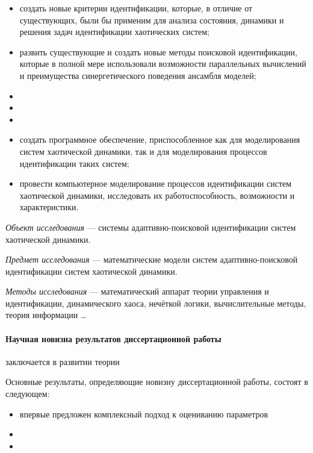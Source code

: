 \begin{itemize}

\item
  создать новые критерии идентификации, которые, в отличие от существующих,
  были бы применим для анализа состояния, динамики и решения задач идентификации
  хаотических систем;

\item
  развить существующие и создать новые методы поисковой идентификации,
  которые в полной мере использовали возможности
  параллельных вычислений и преимущества синергетического поведения
  ансамбля моделей;

\item


\item

\item

\item
  создать программное обеспечение, приспособленное как
  для моделирования систем хаотической динамики,
  так и для моделирования процессов идентификации таких систем;

\item
  провести компьютерное моделирование процессов идентификации систем хаотической динамики,
  исследовать их работоспособность, возможности и характеристики.


\end{itemize}

\textit{Объект исследования} ---
системы адаптивно-поисковой идентификации систем хаотической динамики.

\textit{Предмет исследования} ---
математические модели систем адаптивно-поисковой идентификации систем хаотической динамики.

\textit{Методы исследования} ---
математический аппарат теории управления и идентификации,
динамического хаоса,
нечёткой логики,
вычислительные методы,
теория информации
\ldots

\paragraph{Научная новизна результатов диссертационной работы} заключается в
развитии теории

Основные результаты, определяющие новизну диссертационной работы,
состоят в следующем:

\begin{itemize}

\item
  впервые предложен комплексный подход к оцениванию параметров

\item

\item

\end{itemize}


